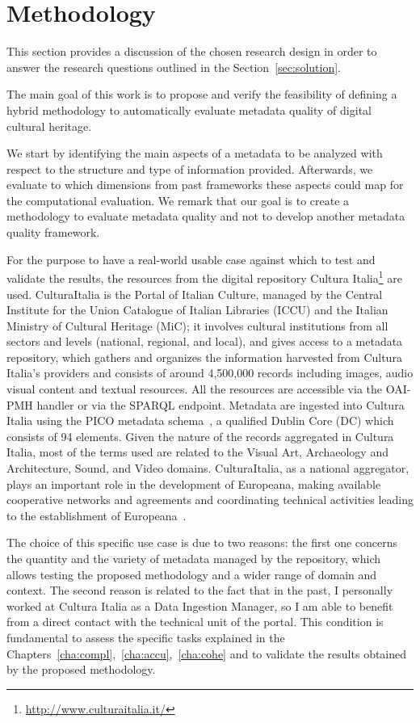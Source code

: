 \documentclass[epsfig,a4paper,12pt,titlepage]{book}
\begin{document}
\section{Methodology}
\label{sec:innovation}
This section provides a discussion of the chosen research design in order to answer the research questions outlined in the Section~\ref{sec:solution}.

The main goal of this work is to propose and verify the feasibility of defining a hybrid methodology to automatically evaluate metadata quality of digital cultural heritage. 

We start by identifying the main aspects of a metadata to be analyzed with respect to the structure and type of information provided. Afterwards, we evaluate to which dimensions from past frameworks these aspects could map for the computational evaluation. We remark that our goal is to create a methodology to evaluate metadata quality and not to develop another metadata quality framework.

For the purpose to have a real-world usable case against which to test and validate the results, the resources from the digital repository Cultura Italia\footnote{\url{http://www.culturaitalia.it/}} are used.
CulturaItalia is the Portal of Italian Culture, managed by the Central Institute for the Union Catalogue of Italian Libraries (ICCU) and the Italian Ministry of Cultural Heritage (MiC); it involves cultural institutions from all sectors and levels  (national,  regional, and local), and gives access to a metadata repository, which gathers and organizes the information harvested from Cultura Italia's providers and consists of around 4,500,000 records including images, audio visual content and textual resources. All the resources are accessible via the OAI-PMH handler or via the SPARQL endpoint\cite{di2015dati}. Metadata are ingested into Cultura Italia using the PICO metadata schema~\cite{8,9}, a qualified Dublin Core (DC) which consists of 94 elements. Given the nature of the records aggregated in Cultura Italia, most of the terms used are related to the Visual Art, Archaeology and Architecture, Sound, and Video domains.
CulturaItalia,  as a national  aggregator,  plays  an  important  role  in  the  development  of  Europeana,  making  available  cooperative  networks  and  agreements and  coordinating  technical  activities  leading  to  the establishment of Europeana~\cite{di2014culturaitalia}.
  

The choice of this specific use case is due to two reasons: the first one concerns the quantity and the variety of metadata managed by the repository, which allows testing the proposed methodology and a wider range of domain and context. The second reason is related to the fact that in the past, I personally worked at Cultura Italia as a Data Ingestion Manager, so I am able to benefit from a direct contact with the technical unit of the portal. This condition is fundamental to assess the specific tasks explained in the Chapters~\ref{cha:compl},~\ref{cha:accu},~\ref{cha:cohe} and to validate the results obtained by the proposed methodology.  
\end{document}
